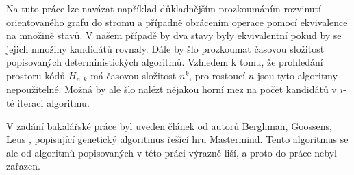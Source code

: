 Na tuto práce lze navázat například důkladnějším prozkoumáním rozvinutí orientovaného grafu do stromu a případně obrácením operace pomocí ekvivalence na množině stavů. V našem případě by dva stavy byly ekvivalentní pokud by se jejich množiny kandidátů rovnaly. Dále by šlo prozkoumat časovou složitost popisovaných deterministických algoritmů. Vzhledem k tomu, že prohledání prostoru kódů $H_{n,k}$ má časovou složitost $n^k$, pro rostoucí $n$ jsou tyto algoritmy nepoužitelné. Možná by ale šlo nalézt nějakou horní mez na počet kandidátů v $i$-té iteraci algoritmu. 


V zadání bakalářské práce byl uveden článek od autorů Berghman, Goossens, Leus \cite{BERGHMAN20091880}, popisující genetický algoritmus řešící hru Mastermind. Tento algoritmus se ale od algoritmů popisovaných v této práci výrazně liší, a proto do práce nebyl zařazen. 


